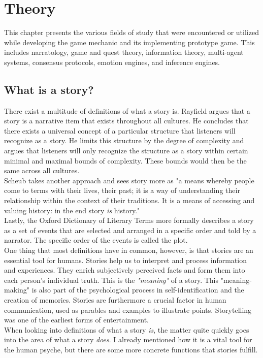 \chapter{Theory} %
This chapter presents the various fields of study that were encountered or utilized while developing the game mechanic and its implementing prototype game. This includes narratology, game and quest theory, information theory, multi-agent systems, consensus protocols, emotion engines, and inference engines.
\section{What is a story?}
There exist a multitude of definitions of what a story is. Rayfield argues that a story is a narrative item that exists throughout all cultures. He concludes that there exists a universal concept of a particular structure that listeners will recognize as a story. He limits this structure by the degree of complexity and argues that listeners will only recognize the structure as a story within certain minimal and maximal bounds of complexity. These bounds would then be the same across all cultures.~\cite{Rayfield1972}\\
Scheub takes another approach and sees story more as "a means whereby people come to terms with their lives, their past; it is a way of understanding their relationship within the context of their traditions. It is a means of accessing and valuing history: in the end story \textit{is} history."~\cite{Scheub1998}\\
Lastly, the Oxford Dictionary of Literary Terms more formally describes a story as a set of events that are selected and arranged in a specific order and told by a narrator. The specific order of the events is called the plot.~\cite{Baldick1996}\\
One thing that most definitions have in common, however, is that stories are an essential tool for humans. Stories help us to interpret and process information and experiences. They enrich subjectively perceived facts and form them into each person's individual truth. This is the \textit{"meaning"} of a story. This "meaning-making" is also part of the psychological process in self-identification and the creation of memories. Stories are furthermore a crucial factor in human communication, used as parables and examples to illustrate points. Storytelling was one of the earliest forms of entertainment.~\cite{Flanagan1992}\\
When looking into definitions of what a story \textit{is}, the matter quite quickly goes into the area of what a story \textit{does}. I already mentioned how it is a vital tool for the human psyche, but there are some more concrete functions that stories fulfill.
